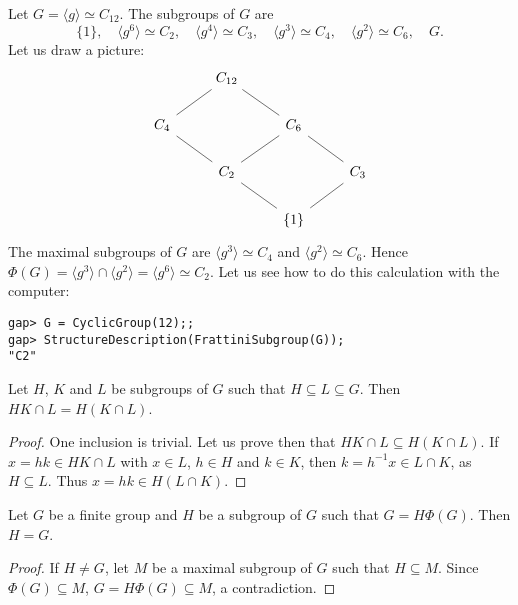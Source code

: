 \begin{example}
Let $G=\langle g\rangle\simeq C_{12}$. The subgroups of $G$ are 
\[
\{1\},\quad
\langle g^6\rangle\simeq C_2,\quad
\langle g^4\rangle\simeq C_3,\quad
\langle g^3\rangle\simeq C_4,\quad
\langle g^2\rangle\simeq C_6,\quad
G.
\]
Let us draw a picture:
\[\begin{tikzcd}
	& {C_{12}} \\
	{C_4} && {C_6} \\
	& {C_2} && {C_3} \\
	&& {\{1\}}
	\arrow[no head, from=4-3, to=3-2]
	\arrow[no head, from=4-3, to=3-4]
	\arrow[no head, from=3-4, to=2-3]
	\arrow[no head, from=2-3, to=1-2]
	\arrow[no head, from=3-2, to=2-1]
	\arrow[no head, from=2-1, to=1-2]
	\arrow[no head, from=3-2, to=2-3]
\end{tikzcd}\]
The maximal subgroups of $G$ are 
$\langle g^3\rangle\simeq C_4$ and $\langle
g^2\rangle\simeq C_6$. Hence $\Phi(G)=\langle g^3\rangle\cap \langle
g^2\rangle=\langle g^6\rangle\simeq C_2$. 
Let us see how to do this calculation with the computer:
\begin{lstlisting}
gap> G = CyclicGroup(12);;
gap> StructureDescription(FrattiniSubgroup(G));
"C2"
\end{lstlisting} 
\end{example}

\begin{lemma}[Dedekind]
\label{lem:Dedekind}
Let $H$, $K$ and $L$ be subgroups of $G$ 
such that $H\subseteq L\subseteq G$. Then 
$HK\cap L=H(K\cap L)$.
\end{lemma}

\begin{proof}
One inclusion is trivial. Let us prove then that 
$HK\cap L\subseteq H(K\cap L)$. If 
$x=hk\in HK\cap L$ with $x\in L$, $h\in H$ and $k\in K$, then 
$k=h^{-1}x\in L\cap K$, as $H\subseteq L$. Thus $x=hk\in H(L\cap
	K)$.
\end{proof}

\begin{lemma}
\label{lem:G=HPhi(G)}
Let $G$ be a finite group and $H$ be a subgroup of $G$ such that 
$G=H\Phi(G)$. Then $H=G$.
\end{lemma}

\begin{proof}
If $H\ne G$, let $M$ be a maximal subgroup of $G$ such that 
$H\subseteq M$. Since $\Phi(G)\subseteq M$, $G=H\Phi(G)\subseteq M$, a 
contradiction. 
\end{proof}

